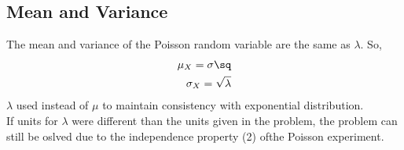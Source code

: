 \subsection{Mean and Variance}  %
The mean and variance of the Poisson random variable are the same as $\lambda$. So,
\begin{align}
    \mu_X =\sigma\sq\\
    \sigma_X=\sqrt\lambda
\end{align}
$\lambda$ used instead of $\mu$ to maintain consistency with exponential distribution.\\
If units for \(\lambda\) were different than the units given in the problem, the problem can still be oslved due to the independence property (2) ofthe Poisson experiment.